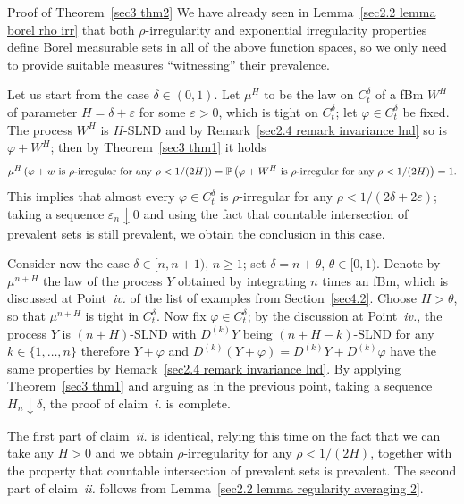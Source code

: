 \documentclass[10pt]{article}
\newcommand{\tmtextit}[1]{{\itshape{#1}}}
\newenvironment{proof*}[1]{\noindent\textbf{#1\ }}{\hspace*{\fill}$\Box$\medskip}
\begin{document}
\begin{proof*}{Proof of Theorem~\ref{sec3 thm2}}
  We have already seen in Lemma~\ref{sec2.2 lemma borel rho irr} that both
  $\rho$\mbox{-}irregularity and exponential irregularity properties define
  Borel measurable sets in all of the above function spaces, so we only need
  to provide suitable measures ``witnessing'' their prevalence.
  
  Let us start from the case $\delta \in (0, 1)$. Let $\mu^H$ to be the law on
  $C^{\delta}_t$ of a fBm $W^H$ of parameter $H = \delta + \varepsilon$ for
  some $\varepsilon > 0$, which is tight on $C^{\delta}_t$; let $\varphi \in
  C^{\delta}_t$ be fixed. The process $W^H$ is $H$\mbox{-}SLND and by
  Remark~\ref{sec2.4 remark invariance lnd} so is $\varphi + W^H$; then by
  Theorem~\ref{sec3 thm1} it holds
  \[ \mu^H \left( \varphi + w \text{ is $\rho$\mbox{-}irregular for any } \rho
     < 1 / (2 H) \right) =\mathbb{P} \left( \varphi + W^H \text{ is
     $\rho$\mbox{-}irregular for any } \rho < 1 / (2 H) \right) = 1. \]
  This implies that almost every $\varphi \in C^{\delta}_t$ is
  $\rho$\mbox{-}irregular for any $\rho < 1 / (2 \delta + 2 \varepsilon)$;
  taking a sequence $\varepsilon_n \downarrow 0$ and using the fact that
  countable intersection of prevalent sets is still prevalent, we obtain the
  conclusion in this case.
  
  Consider now the case $\delta \in [n, n + 1)$, $n \geqslant 1$; set $\delta
  = n + \theta$, $\theta \in [0, 1)$. Denote by $\mu^{n + H}$ the law of the
  process $Y$ obtained by integrating $n$ times an fBm, which is discussed at
  Point~\tmtextit{iv.} of the list of examples from Section~\ref{sec4.2}.
  Choose $H > \theta$, so that $\mu^{n + H}$ is tight in $C^{\delta}_t$. Now
  fix $\varphi \in C^{\delta}_t$; by the discussion at Point~\tmtextit{iv.},
  the process $Y$ is $(n + H)$\mbox{-}SLND with $D^{(k)} Y$ being $(n + H -
  k)$\mbox{-}SLND for any $k \in \{ 1, \ldots, n \}$ therefore $Y + \varphi$
  and $D^{(k)} (Y + \varphi) = D^{(k)} Y + D^{(k)} \varphi$ have the same
  properties by Remark~\ref{sec2.4 remark invariance lnd}. By applying
  Theorem~\ref{sec3 thm1} and arguing as in the previous point, taking a
  sequence $H_n \downarrow \delta$, the proof of claim~\tmtextit{i.} is
  complete.
  
  The first part of claim~\tmtextit{ii.} is identical, relying this time on
  the fact that we can take any $H > 0$ and we obtain
  $\rho$\mbox{-}irregularity for any $\rho < 1 / (2 H)$, together with the
  property that countable intersection of prevalent sets is prevalent. The
  second part of claim~\tmtextit{ii.} follows from Lemma~\ref{sec2.2 lemma
  regularity averaging 2}.
  

\end{proof*}
\end{document}
